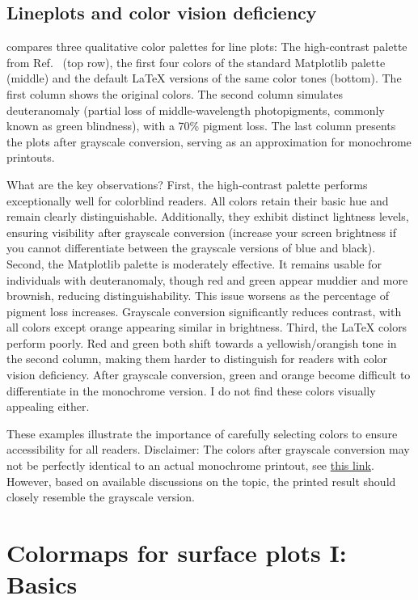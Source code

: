 \subsection{Lineplots and color vision deficiency}\label{sub:lineplots_and_color_deficiency}

 compares three qualitative color palettes for line plots: 
The high-contrast palette from Ref.~\cite{paultol} (top row), the first four colors of the standard Matplotlib palette (middle) and the default \LaTeX{} versions of the same color tones (bottom). The first column shows the original colors. The second column simulates deuteranomaly (partial loss of middle-wavelength photopigments, commonly known as green blindness), with a 70\% pigment loss. The last column presents the plots after grayscale conversion, serving as an approximation for monochrome printouts.

What are the key observations?
First, the high-contrast palette performs exceptionally well for colorblind readers.
All colors retain their basic hue and remain clearly distinguishable. Additionally, they exhibit distinct lightness levels, ensuring visibility after grayscale conversion (increase your screen brightness if you cannot differentiate between the grayscale versions of blue and black).
Second, the Matplotlib palette is moderately effective. It remains usable for individuals with deuteranomaly, though red and green appear muddier and more brownish, reducing distinguishability. This issue worsens as the percentage of pigment loss increases. Grayscale conversion significantly reduces contrast, with all colors except orange appearing similar in brightness.
Third, the \LaTeX{} colors perform poorly. Red and green both shift towards a yellowish/orangish tone in the second column, making them harder to distinguish for readers with color vision deficiency. After grayscale conversion, green and orange become difficult to differentiate in the monochrome version. I do not find these colors visually appealing either. 

These examples illustrate the importance of carefully selecting colors to ensure accessibility for all readers. Disclaimer: The 
colors after grayscale conversion may not be perfectly identical to an actual monochrome printout, see \href{https://1800officesolutions.com/monochrome-vs-grayscale-printing/}{this link}. However, based on available discussions on the topic, the printed result should closely resemble the grayscale version.

\section{Colormaps for surface plots I: Basics}

